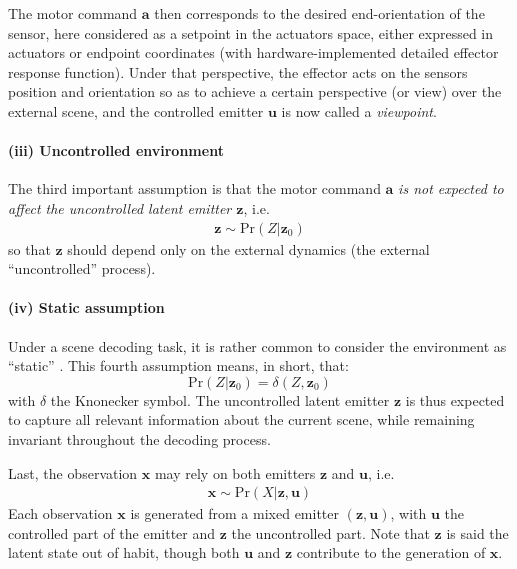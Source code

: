\documentclass[12pt,twoside,openright]{article}
\begin{document}
The motor command $\boldsymbol{a}$ then corresponds to the desired end-orientation of the sensor,
here considered as a setpoint in the actuators space, 
either expressed in actuators or endpoint coordinates (with hardware-implemented detailed effector response function).  
Under that perspective, the effector acts on the sensors position and orientation so as to achieve a certain perspective (or view) over the external scene, and the controlled emitter $\boldsymbol{u}$ is now called a \emph{viewpoint}. 

\paragraph{(iii) Uncontrolled environment}
The third important assumption is that the motor command $\boldsymbol{a}$ \emph{is not expected to affect the uncontrolled latent emitter $\boldsymbol{z}$}, i.e.
\begin{align*}
\boldsymbol{z} \sim \text{Pr}(Z|\boldsymbol{z}_0)
\end{align*}
so that $\boldsymbol{z}$ should depend only on the external dynamics (the external ``uncontrolled'' process).

\paragraph{(iv) Static assumption}
Under a scene decoding  task, 
it is rather common to consider the environment as ``static'' \citep{butko2010infomax}. This fourth assumption means, in short, that:
$$\text{Pr}(Z|\boldsymbol{z}_0) = \delta(Z, \boldsymbol{z}_0)$$ 
with $\delta$ the Knonecker symbol. 
The uncontrolled latent emitter $\boldsymbol{z}$ is thus expected to capture all relevant information about the current scene, while remaining invariant throughout the decoding process.


Last, the {\color{Purple}observation} $\boldsymbol{x}$ may rely on both emitters $\boldsymbol{z}$ and $\boldsymbol{u}$, i.e. 
\begin{align}
\boldsymbol{x} \sim \text{Pr}(X|\boldsymbol{z}, \boldsymbol{u})
\label{eq:gen}
\end{align} 
Each {\color{Purple}observation} $\boldsymbol{x}$ is generated from a mixed emitter $(\boldsymbol{z}, \boldsymbol{u})$, with $\boldsymbol{u}$ the controlled part of the emitter and  $\boldsymbol{z}$ the uncontrolled part. Note that $\boldsymbol{z}$ is said the latent state out of habit, though both $\boldsymbol{u}$ and $\boldsymbol{z}$ contribute to the generation of $\boldsymbol{x}$.
\end{document}
